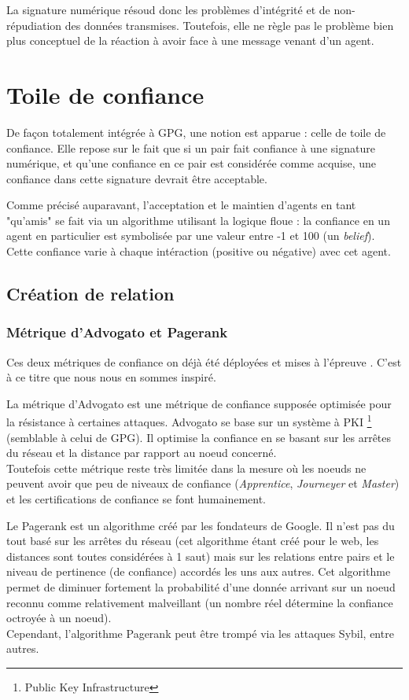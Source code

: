 \documentclass[11pt]{book}
\begin{document}
La signature numérique résoud donc les problèmes d'intégrité et de 
non-répudiation des données transmises. Toutefois, elle ne règle pas le 
problème bien plus conceptuel de la réaction à avoir face à une message 
venant d'un agent.

\section{Toile de confiance}
De façon totalement intégrée à GPG, une notion est apparue : celle de 
toile de confiance. Elle repose sur le fait que si un pair fait confiance 
à une signature numérique, et qu'une confiance en ce pair est considérée 
comme acquise, une confiance dans cette signature devrait être acceptable.

Comme précisé auparavant, l'acceptation et le maintien d'agents en tant 
"qu'amis" se fait via un algorithme utilisant la logique floue : la confiance
en un agent en particulier est symbolisée par une valeur entre -1 et 100 
(un \textit{belief}). Cette confiance varie à chaque intéraction (positive ou 
négative) avec cet agent.

\subsection{Création de relation}
\subsubsection{Métrique d'Advogato et Pagerank}
Ces deux métriques de confiance on déjà été déployées et mises à l'épreuve
\cite{ruder2004comparison}. C'est à ce titre que nous nous en sommes inspiré.

La métrique d'Advogato est une métrique de confiance supposée optimisée pour
la résistance à certaines attaques. Advogato se base sur un système à PKI
\footnote{Public Key Infrastructure} (semblable à celui de GPG). Il optimise 
la confiance en se basant sur les arrêtes du réseau et la distance par 
rapport au noeud concerné. \\
Toutefois cette métrique reste très limitée dans la mesure où les noeuds ne 
peuvent avoir que peu de niveaux de confiance (\textit{Apprentice}, 
\textit{Journeyer} et \textit{Master}) et les certifications de confiance se 
font humainement.

Le Pagerank est un algorithme créé par les fondateurs de Google. Il n'est 
pas du tout basé sur les arrêtes du réseau (cet algorithme étant créé pour 
le web, les distances sont toutes considérées à 1 saut) mais sur les 
relations entre pairs et le niveau de pertinence (de confiance) accordés 
les uns aux autres. Cet algorithme permet de diminuer fortement la 
probabilité d'une donnée arrivant sur un noeud reconnu comme relativement 
malveillant (un nombre réel détermine la confiance octroyée à un 
noeud). \\
Cependant, l'algorithme Pagerank peut être trompé \cite{wassner2012pagerank} 
via les attaques Sybil, entre autres.
\end{document}
